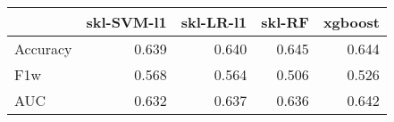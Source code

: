 \begin{tabular}{lrrrr}
\toprule
{} &  skl-SVM-l1 &  skl-LR-l1 &  skl-RF &  xgboost \\
\midrule
Accuracy &       0.639 &      0.640 &   0.645 &    0.644 \\
F1w      &       0.568 &      0.564 &   0.506 &    0.526 \\
AUC      &       0.632 &      0.637 &   0.636 &    0.642 \\
\bottomrule
\end{tabular}
